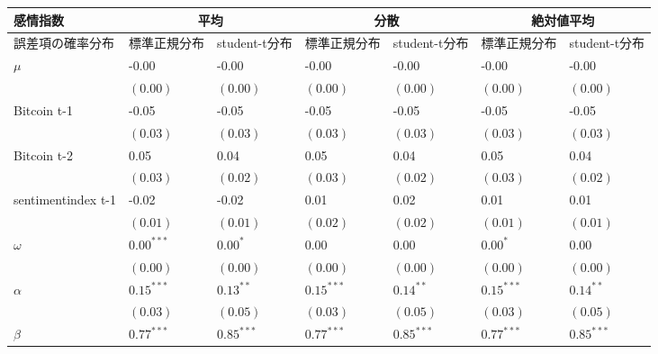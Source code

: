 




\begin{landscape}
\begin{table}[]
\begin{tabular}{lllllll}
\hline
感情指数               & \multicolumn{2}{c}{平均}      & \multicolumn{2}{c}{分散}      & \multicolumn{2}{c}{絶対値平均}   \\ \hline
誤差項の確率分布           & 標準正規分布       & student-t分布  & 標準正規分布       & student-t分布  & 標準正規分布       & student-t分布  \\ \hline
$\mu$              & -0.00        & -0.00        & -0.00        & -0.00        & -0.00        & -0.00        \\
                   & $(0.00)$     & $(0.00)$     & $(0.00)$     & $(0.00)$     & $(0.00)$     & $(0.00)$     \\
Bitcoin t-1        & -0.05        & -0.05        & -0.05        & -0.05        & -0.05        & -0.05        \\
                   & $(0.03)$     & $(0.03)$     & $(0.03)$     & $(0.03)$     & $(0.03)$     & $(0.03)$     \\
Bitcoin t-2        & 0.05         & 0.04         & 0.05         & 0.04         & 0.05         & 0.04         \\
                   & $(0.03)$     & $(0.02)$     & $(0.03)$     & $(0.02)$     & $(0.03)$     & $(0.02)$     \\
sentimentindex t-1 & -0.02        & -0.02        & 0.01         & 0.02         & 0.01         & 0.01         \\
                   & $(0.01)$     & $(0.01)$     & $(0.02)$     & $(0.02)$     & $(0.01)$     & $(0.01)$     \\
$\omega$           & $0.00^{***}$ & $0.00^{*}$   & 0.00         & 0.00         & $0.00^{*}$   & 0.00         \\
                   & $(0.00)$     & $(0.00)$     & $(0.00)$     & $(0.00)$     & $(0.00)$     & $(0.00)$     \\
$\alpha$           & $0.15^{***}$ & $0.13^{**}$  & $0.15^{***}$ & $0.14^{**}$  & $0.15^{***}$ & $0.14^{**}$  \\
                   & $(0.03)$     & $(0.05)$     & $(0.03)$     & $(0.05)$     & $(0.03)$     & $(0.05)$     \\
$\beta$            & $0.77^{***}$ & $0.85^{***}$ & $0.77^{***}$ & $0.85^{***}$ & $0.77^{***}$ & $0.85^{***}$ \\

\end{tabular}
\end{table}
\end{landscape}
